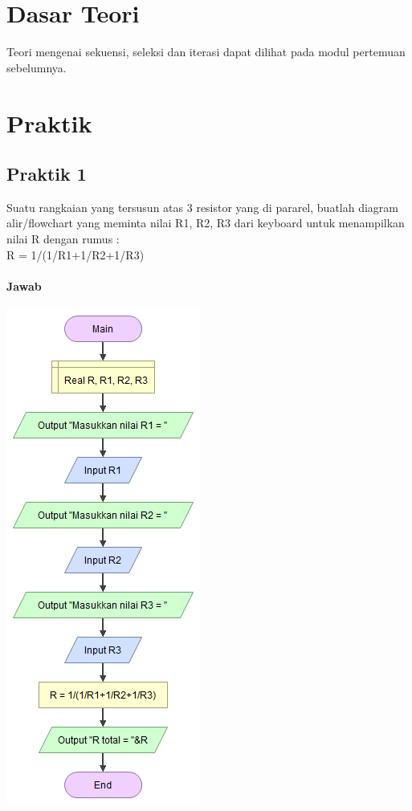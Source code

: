 \documentclass[a4paper,12pt]{article}
\begin{document}
\section{Dasar Teori}
Teori mengenai sekuensi, seleksi dan iterasi dapat dilihat pada modul pertemuan sebelumnya.

\newpage

\section{Praktik}
\subsection{Praktik 1}
Suatu rangkaian yang tersusun atas 3 resistor yang di pararel, buatlah diagram alir/flowchart yang meminta nilai R1, R2, R3 dari keyboard untuk menampilkan nilai
R dengan rumus :\\
R = 1/(1/R1+1/R2+1/R3)
\paragraph{Jawab}
\begin{center}
    \includegraphics[height=.6\textheight]{praktik1 - Main.png}
\end{center}
\end{document}
